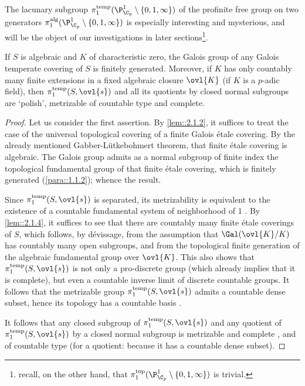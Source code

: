 \medskip The lacunary subgroup
$\pi_1^{\mathrm{temp}}(\P^1_{\C_p}\setminus \{0,1,\infty\})$ of the
profinite free group on two generators
$\pi_1^{\mathrm{alg}}(\P^1_{\C_p}\setminus \{0,1,\infty\})$ is
especially interesting and mysterious, and will be the 
object of our investigations in later sections\footnote{recall, on the
other hand, that $\pi_1^{\mathrm{top}}(\P^1_{\C_p}\setminus
\{0,1,\infty\})$ is trivial.}.

\begin{pro}\label{pro::2.1.6} If $S$ is algebraic and $K$ of
 characteristic zero, the Galois group of any Galois temperate 
 covering of $S$ is finitely generated. Moreover, 
 if $K$ has only countably many finite 
 extensions in a fixed algebraic closure $\ovl{K}$ (\eg if $K$ is a 
 $p$-adic field), then 
 $\pi_1^{\mathrm{temp}}(S,\ovl{s})$ and all its quotients by closed
 normal subgroups are `polish', \ie metrizable of countable type and
 complete.
\end{pro}

\begin{proof}
 Let us consider the first assertion. By \ref{lem::2.1.2}, it suffices to
 treat the case of the universal topological covering of a finite Galois
 \'etale covering.  By the already mentioned Gabber-L\"utkebohmert
 theorem, that finite \'etale covering is algebraic. The Galois group
 admits as a normal subgroup of finite index the topological fundamental
 group of that finite \'etale covering, which is finitely generated 
 (\cf \ref{para::1.1.2}); whence the result.

 \noindent Since $\pi_1^{\mathrm{temp}}(S,\ovl{s})$ is separated, its
 metrizability is equivalent to the existence of a countable fundamental
 system of neighborhood of $1$ \cite[IX.3.1 prop. 1]{bourbaki74:_topol}.
 By \ref{lem::2.1.4}, it 
 suffices to see that there are countably many finite \'etale coverings
 of $S$, 
 which follows, by d\'evissage, from the assumption that
 $\Gal(\ovl{K}/K)$ has countably many open subgroups, and from the
 topological finite generation of the algebraic fundamental group over
 $\ovl{K}$.
 This also shows that
 $\pi_1^{\mathrm{temp}}(S,\ovl{s})$ is not only a pro-discrete group
 (which already implies that it is complete), but even a countable
 inverse limit of discrete countable groups. It follows that the
 metrizable group $\pi_1^{\mathrm{temp}}(S,\ovl{s})$ admits a 
 countable dense subset, hence its topology has a countable basis 
 \cite[IX.2.8 prop. 12]{bourbaki74:_topol}.

 \noindent It follows that any closed subgroup of
 $\pi_1^{\mathrm{temp}}(S,\ovl{s})$ and any quotient of
 $\pi_1^{\mathrm{temp}}(S,\ovl{s})$ by a 
 closed normal subgroup is metrizable and complete 
 \cite[IX.3.1 prop. 4]{bourbaki74:_topol}, 
 and of countable type (for a quotient: because it 
 has a countable dense subset).
\end{proof}

